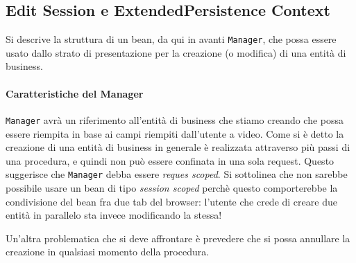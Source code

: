 \subsection{Edit Session e ExtendedPersistence Context}
Si descrive la struttura di un bean, da qui in avanti \texttt{Manager}, che possa essere usato dallo strato di presentazione per la creazione (o modifica) di una entità di business.

\paragraph{Caratteristiche del Manager}
\texttt{Manager} avrà un riferimento all'entità di business che stiamo creando che possa essere riempita in base ai campi riempiti dall'utente a video.
Come si è detto la creazione di una entità di business in generale è realizzata attraverso più passi di una procedura, e quindi non può essere confinata in una sola request. Questo suggerisce che \texttt{Manager} debba essere 
\textsl{reques scoped}. Si sottolinea che non sarebbe possibile usare un bean di tipo \textsl{session scoped} perchè questo comporterebbe la condivisione del bean fra due tab del browser: l'utente che crede di creare due entità in parallelo
sta invece modificando la stessa!

Un'altra problematica che si deve affrontare è prevedere che si possa annullare la creazione in qualsiasi momento della procedura. 